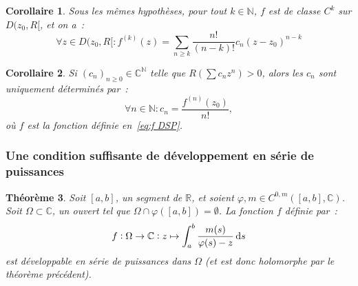 \documentclass{report}
\newtheorem{thm}{Théorème}[chapter]
\newtheorem{cor}[thm]{Corollaire}
\theoremstyle{definition}
\theoremstyle{remark}
\numberwithin{equation}{section}
\newcommand{\C}{\mathbb C}
\newcommand{\R}{\mathbb R}
\newcommand{\N}{\mathbb N}
\begin{document}
			\begin{cor} Sous les mêmes hypothèses, pour tout $k \in \N$, $f$ est de classe $C^k$ sur $D(z_0, R[$, et on a~:
			\begin{equation}
				\forall z \in D(z_0, R[ : f^{(k)}(z) = \sum_{n \geq k}\frac {n!}{(n-k)!}c_n(z-z_0)^{n-k}
			\end{equation}
			\end{cor}

			\begin{cor} Si $(c_n)_{n \geq 0} \in \C^\N$ telle que $R\left(\sum c_nz^n\right) > 0$, alors les $c_n$ sont uniquement déterminés par~:
			\begin{equation}
				\forall n \in \N : c_n = \frac {f^{(n)}(z_0)}{n!},
			\end{equation}
			où $f$ est la fonction définie en~\eqref{eq:f DSP}.
			\end{cor}

		\subsubsection{Une condition suffisante de développement en série de puissances}
			\begin{thm}\label{thm:frac C0m DSP} Soit $[a, b]$, un segment de $\R$, et soient $\varphi, m \in C^{0,m}([a, b], \C)$. Soit $\Omega \subset \C$, un ouvert tel que
			$\Omega \cap \varphi([a, b]) = \emptyset$. La fonction $f$ définie par~:
			\begin{equation}
				f : \Omega \to \C : z \mapsto \int_a^b\frac {m(s)}{\varphi(s) - z}\dif s
			\end{equation}
			est développable en série de puissances dans $\Omega$ (et est donc holomorphe par le théorème précédent).
			\end{thm}
\end{document}
